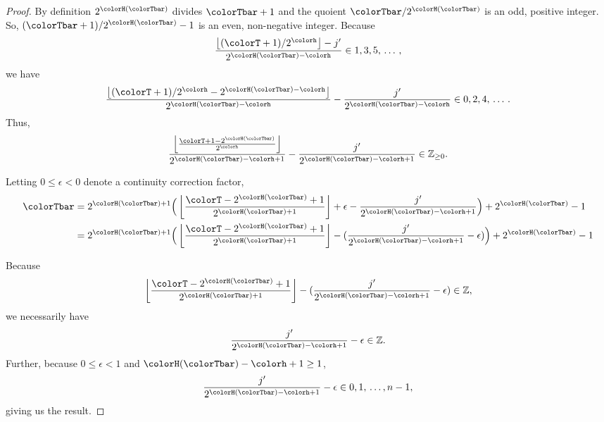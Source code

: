 \begin{proof}
By definition $2^{\colorH(\colorTbar)}$ divides $\colorTbar + 1$ and the quoient $\colorTbar / 2^{\colorH(\colorTbar)}$ is an odd, positive integer.
So, $(\colorTbar + 1) / 2^{\colorH(\colorTbar)} - 1$ is an even, non-negative integer.
Because
\begin{align*}
\frac{\left\lfloor (\colorT + 1) / 2^{\colorh} \right\rfloor - j'}{2^{\colorH(\colorTbar) - \colorh}} \in 1, 3, 5, \, \ldots \, ,
\end{align*}
we have
\begin{align*}
\frac{\left\lfloor (\colorT + 1) / 2^{\colorh} - 2^{\colorH(\colorTbar) - \colorh} \right\rfloor}{2^{\colorH(\colorTbar) - \colorh}}
- \frac{j'}{2^{\colorH(\colorTbar) - \colorh}} \in 0, 2, 4, \, \ldots \, .
\end{align*}
Thus,
\begin{align*}
\frac{
  \left\lfloor
  \frac{\colorT + 1 - 2^{\colorH(\colorTbar)}}{2^{\colorh}}
  \right\rfloor
}{
  2^{\colorH(\colorTbar) - \colorh + 1}
}
- \frac{j'}{
  2^{\colorH(\colorTbar) - \colorh + 1}
}
\in \mathbb{Z}_{\geq0}.
\end{align*}

Letting $0 \leq \epsilon < 0$ denote a continuity correction factor,
\begin{align*}
\colorTbar
&= 2^{\colorH(\colorTbar) + 1}
\Big(
\left\lfloor
\frac{
  \colorT - 2^{\colorH(\colorTbar)} + 1
}{
  2^{\colorH(\colorTbar) + 1}
}
\right\rfloor
+ \epsilon
- \frac{j'}{2^{\colorH(\colorTbar) - \colorh + 1}}
\Big)
+ 2^{\colorH(\colorTbar)}
- 1\\
&= 2^{\colorH(\colorTbar) + 1}
\Big(
\left\lfloor
\frac{
  \colorT - 2^{\colorH(\colorTbar)} + 1
}{
  2^{\colorH(\colorTbar) + 1}
}
\right\rfloor
- (
  \frac{j'}{2^{\colorH(\colorTbar) - \colorh + 1}}
  - \epsilon
)
\Big)
+ 2^{\colorH(\colorTbar)}
- 1\\
\end{align*}

Because
\begin{align*}
\left\lfloor
\frac{
  \colorT - 2^{\colorH(\colorTbar)} + 1
}{
  2^{\colorH(\colorTbar) + 1}
}
\right\rfloor
- (
\frac{j'}{2^{\colorH(\colorTbar) - \colorh + 1}}
- \epsilon
)
\in \mathbb{Z},
\end{align*}
we necessarily have
\begin{align*}
\frac{j'}{2^{\colorH(\colorTbar) - \colorh + 1}}
- \epsilon
\in \mathbb{Z}.
\end{align*}
Further, because $0 \leq \epsilon < 1$ and $\colorH(\colorTbar) - \colorh  + 1 \geq 1$,
\begin{align*}
\frac{j'}{2^{\colorH(\colorTbar) - \colorh + 1}}
- \epsilon
\in
0, 1, \,\ldots, n - 1,
\end{align*}
giving us the result.
\end{proof}
